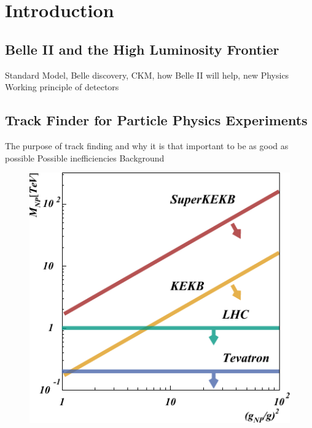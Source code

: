 \chapter{Introduction}
\section{Belle II and the High Luminosity Frontier}
Standard Model, Belle discovery, CKM, how Belle II will help, new Physics
Working principle of detectors
\section{Track Finder for Particle Physics Experiments}
The purpose of track finding and why it is that important to be as good as possible
Possible inefficiencies
Background

\begin{figure}
  \centering
  \includegraphics[width=0.6\linewidth]{figures/general/luminosity.pdf}
  \caption{\cite{tdr}}
\end{figure}


